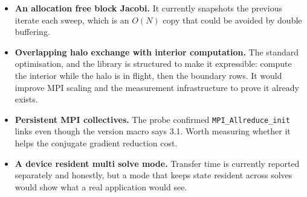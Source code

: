 \documentclass[11pt,a4paper]{report}
\begin{document}
\begin{itemize}[leftmargin=*]
  \item \textbf{An allocation free block Jacobi.} It currently snapshots the
        previous iterate each sweep, which is an $O(N)$ copy that could be
        avoided by double buffering.
  \item \textbf{Overlapping halo exchange with interior computation.} The
        standard optimisation, and the library is structured to make it
        expressible: compute the interior while the halo is in flight, then the
        boundary rows. It would improve MPI scaling and the measurement
        infrastructure to prove it already exists.
  \item \textbf{Persistent MPI collectives.} The probe confirmed
        \texttt{MPI\_Allreduce\_init} links even though the version macro says
        3.1. Worth measuring whether it helps the conjugate gradient reduction
        cost.
  \item \textbf{A device resident multi solve mode.} Transfer time is currently
        reported separately and honestly, but a mode that keeps state resident
        across solves would show what a real application would see.
\end{itemize}
\end{document}
